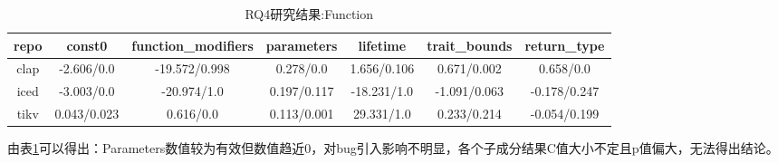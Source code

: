 \begin{table}[ht]
	\centering
	\caption{RQ4研究结果:Function}
	\begin{tabular}{ccccccc}
        \toprule
		\textbf{repo} & \textbf{const0}      & \textbf{function\_modifiers} & \textbf{parameters}  & \textbf{lifetime}    & \textbf{trait\_bounds} & \textbf{return\_type}  \\
        \midrule
		clap & \cellcolor{orange!30}-2.606/0.0  & \cellcolor{gray!20}-19.572/0.998      & \cellcolor{green!20}0.278/0.0   & \cellcolor{gray!20}1.656/0.106 & \cellcolor{green!20}0.671/0.002  & \cellcolor{green!20}0.658/0.0    \\
		iced & \cellcolor{orange!30}-3.003/0.0  & \cellcolor{gray!20}-20.974/1.0        & \cellcolor{gray!20}0.197/0.117 & \cellcolor{gray!20}-18.231/1.0 & \cellcolor{gray!20}-1.091/0.063 & \cellcolor{gray!20}-0.178/0.247 \\
		tikv & \cellcolor{green!20}0.043/0.023 & \cellcolor{green!20}0.616/0.0          & \cellcolor{green!20}0.113/0.001 & \cellcolor{gray!20}29.331/1.0  & \cellcolor{gray!20}0.233/0.214  & \cellcolor{gray!20}-0.054/0.199   \\
        \bottomrule
	\end{tabular}
	\label{tab:RQ4-3}
\end{table}

由表\ref{tab:RQ4-3}可以得出：Parameters数值较为有效但数值趋近0，对bug引入影响不明显，各个子成分结果C值大小不定且p值偏大，无法得出结论。

